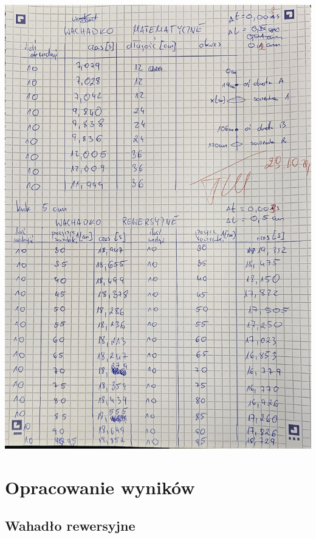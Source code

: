 \documentclass[a4paper, 11pt]{article}
\begin{document}
\begin{center}
	\includegraphics[scale=0.25]{images/pomiary.jpg}
\end{center}

\pagebreak
\section{Opracowanie wyników}\label{sec:opracowanie_wynikow} %

\subsection{Wahadło rewersyjne}
\end{document}

